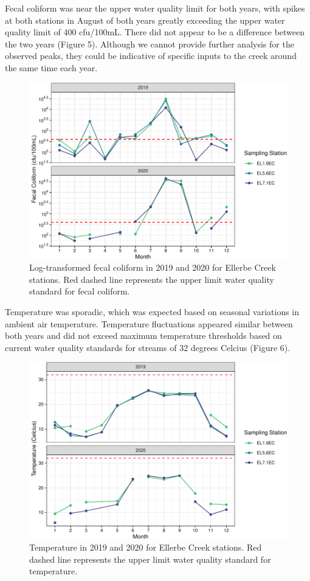 \documentclass[
  12pt,
]{article}
\begin{document}
Fecal coliform was near the upper water quality limit for both years,
with spikes at both stations in August of both years greatly exceeding
the upper water quality limit of 400 cfu/100mL. There did not appear to
be a difference between the two years (Figure 5). Although we cannot
provide further analysis for the observed peaks, they could be
indicative of specific inputs to the creek around the same time each
year.

\begin{figure}
\centering
\includegraphics{August_Lindborg_ENV872_Project_files/figure-latex/unnamed-chunk-17-1.pdf}
\caption{Log-transformed fecal coliform in 2019 and 2020 for Ellerbe
Creek stations. Red dashed line represents the upper limit water quality
standard for fecal coliform.}
\end{figure}

Temperature was sporadic, which was expected based on seasonal
variations in ambient air temperature. Temperature fluctuations appeared
similar between both years and did not exceed maximum temperature
thresholds based on current water quality standards for streams of 32
degrees Celcius (Figure 6).

\begin{figure}
\centering
\includegraphics{August_Lindborg_ENV872_Project_files/figure-latex/unnamed-chunk-18-1.pdf}
\caption{Temperature in 2019 and 2020 for Ellerbe Creek stations. Red
dashed line represents the upper limit water quality standard for
temperature.}
\end{figure}
\end{document}
